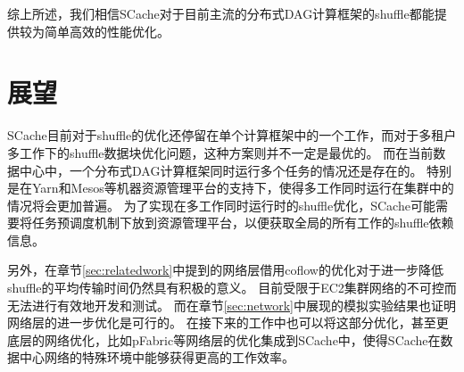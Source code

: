 综上所述，我们相信SCache对于目前主流的分布式DAG计算框架的shuffle都能提供较为简单高效的性能优化。

\section{展望}

SCache目前对于shuffle的优化还停留在单个计算框架中的一个工作，而对于多租户多工作下的shuffle数据块优化问题，这种方案则并不一定是最优的。
而在当前数据中心中，一个分布式DAG计算框架同时运行多个任务的情况还是存在的。
特别是在Yarn\cite{yarn}和Mesos\cite{mesos}等机器资源管理平台的支持下，使得多工作同时运行在集群中的情况将会更加普遍。
为了实现在多工作同时运行时的shuffle优化，SCache可能需要将任务预调度机制下放到资源管理平台，以便获取全局的所有工作的shuffle依赖信息。

另外，在章节\ref{sec:relatedwork}中提到的网络层借用coflow的优化对于进一步降低shuffle的平均传输时间仍然具有积极的意义。
目前受限于EC2集群网络的不可控而无法进行有效地开发和测试。
而在章节\ref{sec:network}中展现的模拟实验结果也证明网络层的进一步优化是可行的。
在接下来的工作中也可以将这部分优化，甚至更底层的网络优化，比如pFabric\cite{pfabric}等网络层的优化集成到SCache中，使得SCache在数据中心网络的特殊环境中能够获得更高的工作效率。



